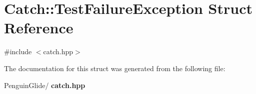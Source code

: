 \section{Catch\+::Test\+Failure\+Exception Struct Reference}
\label{struct_catch_1_1_test_failure_exception}


{\ttfamily \#include $<$catch.\+hpp$>$}



The documentation for this struct was generated from the following file\+:\begin{DoxyCompactItemize}
\item 
Penguin\+Glide/\textbf{ catch.\+hpp}\end{DoxyCompactItemize}
